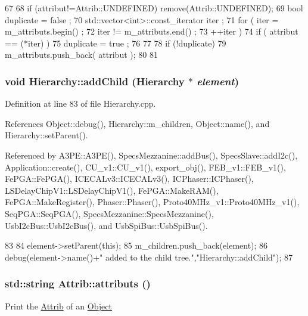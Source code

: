 \begin{DoxyCode}
67                             {
68     if (attribut!=Attrib::UNDEFINED) remove(Attrib::UNDEFINED);
69     bool duplicate = false ;
70     std::vector<int>::const_iterator iter ;
71     for ( iter  = m_attributs.begin() ;
72           iter != m_attributs.end()   ;
73           ++iter ) {
74       if ( attribut == (*iter) ) {
75         duplicate = true ;
76       }
77     }
78     if (!duplicate) {
79       m_attributs.push_back( attribut );
80     }
81   }
\end{DoxyCode}
\hypertarget{classHierarchy_ad677774ff38fcb257c04a3a10d471fac}{
\subsubsection[{addChild}]{\setlength{\rightskip}{0pt plus 5cm}void Hierarchy::addChild ({\bf Hierarchy} $\ast$ {\em element})}}
\label{classHierarchy_ad677774ff38fcb257c04a3a10d471fac}


Definition at line 83 of file Hierarchy.cpp.

References Object::debug(), Hierarchy::m\_\-children, Object::name(), and Hierarchy::setParent().

Referenced by A3PE::A3PE(), SpecsMezzanine::addBus(), SpecsSlave::addI2c(), Application::create(), CU\_\-v1::CU\_\-v1(), export\_\-obj(), FEB\_\-v1::FEB\_\-v1(), FePGA::FePGA(), ICECALv3::ICECALv3(), ICPhaser::ICPhaser(), LSDelayChipV1::LSDelayChipV1(), FePGA::MakeRAM(), FePGA::MakeRegister(), Phaser::Phaser(), Proto40MHz\_\-v1::Proto40MHz\_\-v1(), SeqPGA::SeqPGA(), SpecsMezzanine::SpecsMezzanine(), UsbI2cBus::UsbI2cBus(), and UsbSpiBus::UsbSpiBus().


\begin{DoxyCode}
83                                           {
84   element->setParent(this);
85   m_children.push_back(element);
86   debug(element->name()+" added to the child tree.","Hierarchy::addChild");
87 }
\end{DoxyCode}
\hypertarget{classAttrib_aee7bbf16b144887f196e1341b24f8a26}{
\subsubsection[{attributs}]{\setlength{\rightskip}{0pt plus 5cm}std::string Attrib::attributs ()}}
\label{classAttrib_aee7bbf16b144887f196e1341b24f8a26}
Print the \hyperlink{classAttrib}{Attrib} of an \hyperlink{classObject}{Object} 

